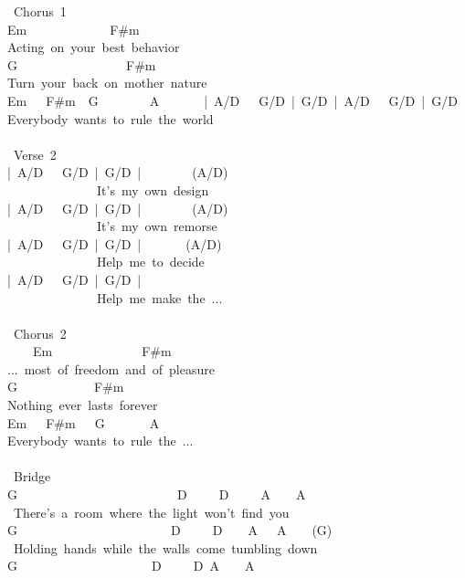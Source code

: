 {\lbrack\ Chorus\ 1\rbrack\\
Em\ \ \ \ \ \ \ \ \ \ \ \ \ F\#m\\
Acting\ on\ your\ best\ behavior\\
G\ \ \ \ \ \ \ \ \ \ \ \ \ \ \ \ \ F\#m\\
Turn\ your\ back\ on\ mother\ nature\\
Em\ \ \ F\#m\ \ G\ \ \ \ \ \ \ \ A\ \ \ \ \ \ \ |\ A/D\ \ \ G/D\ |\ G/D\ |\ A/D\ \ \ G/D\ |\ G/D\ \\
Everybody\ wants\ to\ rule\ the\ world\\
\\
\lbrack\ Verse\ 2\rbrack\\
|\ A/D\ \ \ G/D\ |\ G/D\ |\ \ \ \ \ \ \ \ (A/D)\\
\ \ \ \ \ \ \ \ \ \ \ \ \ \ It's\ my\ own\ design\\
|\ A/D\ \ \ G/D\ |\ G/D\ |\ \ \ \ \ \ \ \ (A/D)\\
\ \ \ \ \ \ \ \ \ \ \ \ \ \ It's\ my\ own\ remorse\\
|\ A/D\ \ \ G/D\ |\ G/D\ |\ \ \ \ \ \ \ (A/D)\\
\ \ \ \ \ \ \ \ \ \ \ \ \ \ Help\ me\ to\ decide\\
|\ A/D\ \ \ G/D\ |\ G/D\ |\\
\ \ \ \ \ \ \ \ \ \ \ \ \ \ Help\ me\ make\ the\ ...\\
\\
\lbrack\ Chorus\ 2\rbrack\\
\ \ \ \ Em\ \ \ \ \ \ \ \ \ \ \ \ \ \ F\#m\\
...\ most\ of\ freedom\ and\ of\ pleasure\\
G\ \ \ \ \ \ \ \ \ \ \ \ F\#m\\
Nothing\ ever\ lasts\ forever\\
Em\ \ \ F\#m\ \ \ G\ \ \ \ \ \ \ A\\
Everybody\ wants\ to\ rule\ the\ ...\\
\\
\lbrack\ Bridge\rbrack\\
G\ \ \ \ \ \ \ \ \ \ \ \ \ \ \ \ \ \ \ \ \ \ \ \ \ D\ \ \ \ \ D\ \ \ \ \ A\ \ \ \ A\\
\ There's\ a\ room\ where\ the\ light\ won't\ find\ you\\
G\ \ \ \ \ \ \ \ \ \ \ \ \ \ \ \ \ \ \ \ \ \ \ \ D\ \ \ \ \ D\ \ \ \ A\ \ \ A\ \ \ \ (G)\\
\ Holding\ hands\ while\ the\ walls\ come\ tumbling\ down\\
G\ \ \ \ \ \ \ \ \ \ \ \ \ \ \ \ \ \ \ \ \ D\ \ \ \ \ D\ A\ \ \ \ A\\
}

